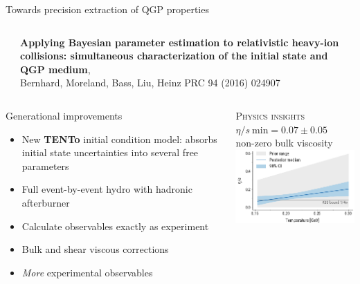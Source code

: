 \documentclass{beamer}
\newcommand{\trento}{T\raisebox{-0.3ex}{R}ENTo}
\begin{document}
\begin{frame}{Towards precision extraction of QGP properties}
\begin{columns}[T]
\begin{column}{0.05\textwidth}
    \end{column}
    \begin{column}{0.9\textwidth}
      \scriptsize {}
      \textbf{Applying Bayesian parameter estimation to relativistic heavy-ion collisions: simultaneous characterization of the initial state and QGP medium},\\
      Bernhard, Moreland, Bass, Liu, Heinz PRC 94 (2016) 024907
    \end{column}
    \begin{column}{0.025\textwidth}
    \end{column}
  \end{columns}
  \begin{columns}[T]
    \begin{column}{.5\textwidth}
      \begin{center}
      \begin{block}{Generational improvements}
        \begin{itemize}
          \scriptsize 
          \item New \textbf{\trento} initial condition model: absorbs initial state uncertainties into several free parameters
          \item Full event-by-event hydro with hadronic afterburner
          \item Calculate observables exactly as experiment
          \item Bulk and shear viscous corrections
          \item \emph{More} experimental observables
        \end{itemize}
      \end{block}
      \end{center}
    \end{column}
    \begin{column}{.5\textwidth}
      \begin{center} 
        {\scshape Physics insights}\\[1ex]
        $\eta/s~\text{min} = 0.07 \pm 0.05$ \\
        non-zero bulk viscosity\\[2ex]
        \includegraphics[width=\columnwidth]{etas_estimate}

\end{center}
\end{column}
\end{columns}
\end{frame}
\end{document}
